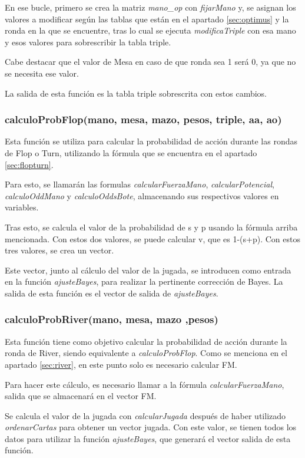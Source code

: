 En ese bucle, primero se crea la matriz \textit{mano\_op} con \textit{fijarMano} y, se asignan los valores a modificar según las tablas que están en el apartado  \ref{sec:optimus} y la ronda en la que se encuentre, tras lo cual se ejecuta \textit{modificaTriple} con esa mano y esos valores para sobrescribir la tabla triple.

Cabe destacar que el valor de Mesa en caso de que ronda sea 1 será 0, ya que no se necesita ese valor.

La salida de esta función es la tabla triple sobrescrita con estos cambios.

\subsubsection{calculoProbFlop(mano, mesa, mazo, pesos, triple, aa, ao)}

Esta función se utiliza para calcular la probabilidad de acción durante las rondas de Flop o Turn, utilizando la fórmula que se encuentra en el apartado  \ref{sec:flopturn}.

Para esto, se llamarán las formulas \textit{calcularFuerzaMano}, \textit{calcularPotencial}, \textit{calculoOddMano} y \textit{calculoOddsBote}, almacenando sus respectivos valores en variables.

Tras esto, se calcula el valor de la probabilidad de s y p usando la fórmula arriba mencionada. Con estos dos valores, se puede calcular v, que es 1-(s+p). Con estos tres valores, se crea un vector.

Este vector, junto al cálculo del valor de la jugada, se introducen como entrada en la función \textit{ajusteBayes}, para realizar la pertinente corrección de Bayes.
La salida de esta función es el vector de salida de \textit{ajusteBayes}.


\subsubsection{calculoProbRiver(mano, mesa, mazo ,pesos)}

Esta función tiene como objetivo calcular la probabilidad de acción durante la ronda de River, siendo equivalente a \textit{calculoProbFlop}. Como se menciona en el apartado \ref{sec:river}, en este punto solo es necesario calcular FM.

Para hacer este cálculo, es necesario llamar a la fórmula \textit{calcularFuerzaMano}, salida que se almacenará en el vector FM.

Se calcula el valor de la jugada con \textit{calcularJugada} después de haber utilizado \textit{ordenarCartas} para obtener un vector jugada. Con este valor, se tienen todos los datos para utilizar la función \textit{ajusteBayes}, que generará el vector salida de esta función.


